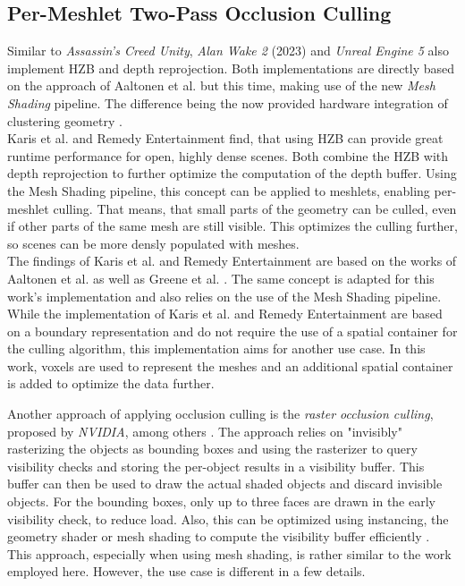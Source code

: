 \subsection*{Per-Meshlet Two-Pass Occlusion Culling}

Similar to \emph{Assassin's Creed Unity}, \emph{Alan Wake 2} (2023) and \emph{Unreal Engine 5} also implement \ac{HZB} 
and depth reprojection. Both implementations are directly based on the approach of Aaltonen et al. \cite{Aaltonen2015} 
but this time, making use of the new \emph{Mesh Shading} pipeline. The difference being the now provided hardware 
integration of clustering geometry \cite{Remedy2023,Karis2021}.  \\

\noindent
Karis et al. and Remedy Entertainment find, that using \ac{HZB} can provide great runtime performance for open, 
highly dense scenes. Both combine the \ac{HZB} with depth reprojection to further optimize the computation of the 
depth buffer. Using the Mesh Shading pipeline, this concept can be applied to meshlets, enabling per-meshlet culling. 
That means, that small parts of the geometry can be culled, even if other parts of the same mesh are still visible. 
This optimizes the culling further, so scenes can be more densly populated with meshes.\\

\noindent
The findings of Karis et al. and Remedy Entertainment are based on the works of Aaltonen et al. \cite{Aaltonen2015}
as well as Greene et al. \cite{Greene93,Greene95}. The same concept is adapted for this work's implementation and 
also relies on the use of the Mesh Shading pipeline.\\

\noindent
While the implementation of Karis et al. and Remedy Entertainment are based on a boundary representation and do not 
require the use of a spatial container for the culling algorithm, this implementation aims for another use case. 
In this work, voxels are used to represent the meshes and an additional spatial container is added to optimize the 
data further. 





Another approach of applying occlusion culling is the \emph{raster occlusion culling}, proposed by \emph{NVIDIA}, among 
others \cite{NVIDIAGLOC2016}. The approach relies on "invisibly" rasterizing the objects as bounding boxes and using the 
rasterizer to query visibility checks and storing the per-object results in a visibility buffer. This buffer can then be 
used to draw the actual shaded objects and discard invisible objects. For the bounding boxes, only up to three faces are 
drawn in the early visibility check, to reduce load. Also, this can be optimized using instancing, the geometry shader or 
mesh shading to compute the visibility buffer efficiently \cite{NVIDIAGLOC2016}. This approach, especially when using 
mesh shading, is rather similar to the work employed here. However, the use case is different in a few details.


